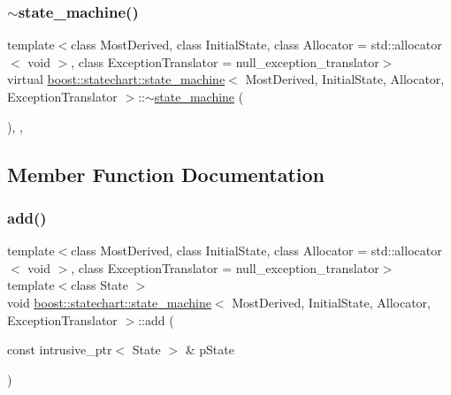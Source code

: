 \mbox{\label{classboost_1_1statechart_1_1state__machine_abd03251def3e351d14451e6b8ffd73b4}} 
\subsubsection{\texorpdfstring{$\sim$state\+\_\+machine()}{~state\_machine()}}
{\footnotesize\ttfamily template$<$class Most\+Derived, class Initial\+State, class Allocator = std\+::allocator$<$ void $>$, class Exception\+Translator = null\+\_\+exception\+\_\+translator$>$ \\
virtual \mbox{\hyperlink{classboost_1_1statechart_1_1state__machine}{boost\+::statechart\+::state\+\_\+machine}}$<$ Most\+Derived, Initial\+State, Allocator, Exception\+Translator $>$\+::$\sim$\mbox{\hyperlink{classboost_1_1statechart_1_1state__machine}{state\+\_\+machine}} (\begin{DoxyParamCaption}{ }\end{DoxyParamCaption})\hspace{0.3cm}{\ttfamily [inline]}, {\ttfamily [protected]}, {\ttfamily [virtual]}}



\subsection{Member Function Documentation}
\mbox{\label{classboost_1_1statechart_1_1state__machine_ae1b47e23bb0486e60f2cc9d80fb76b99}} 
\subsubsection{\texorpdfstring{add()}{add()}}
{\footnotesize\ttfamily template$<$class Most\+Derived, class Initial\+State, class Allocator = std\+::allocator$<$ void $>$, class Exception\+Translator = null\+\_\+exception\+\_\+translator$>$ \\
template$<$class State $>$ \\
void \mbox{\hyperlink{classboost_1_1statechart_1_1state__machine}{boost\+::statechart\+::state\+\_\+machine}}$<$ Most\+Derived, Initial\+State, Allocator, Exception\+Translator $>$\+::add (\begin{DoxyParamCaption}\item[{const intrusive\+\_\+ptr$<$ State $>$ \&}]{p\+State }\end{DoxyParamCaption})\hspace{0.3cm}{\ttfamily [inline]}}

